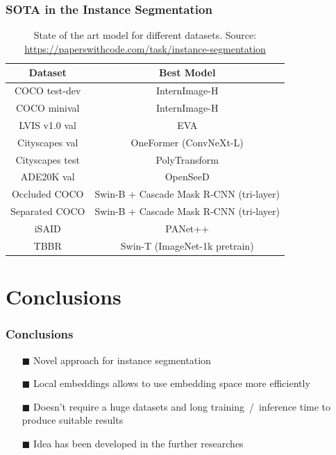 \documentclass{beamer}
\begin{document}
\begin{frame}
    \frametitle{SOTA in the Instance Segmentation}

    \begin{table}
        \begin{tabular}{|c|c|}
            \hline
            \textbf{Dataset} & \textbf{Best Model}                     \\
            \hline
            \hline
            COCO test-dev    & InternImage-H                           \\
            \hline
            COCO minival     & InternImage-H                           \\
            \hline
            LVIS v1.0 val    & EVA                                     \\
            \hline
            Cityscapes val   & OneFormer (ConvNeXt-L)                  \\
            \hline
            Cityscapes test  & PolyTransform                           \\
            \hline
            ADE20K val       & OpenSeeD                                \\
            \hline
            Occluded COCO    & Swin-B + Cascade Mask R-CNN (tri-layer) \\
            \hline
            Separated COCO   & Swin-B + Cascade Mask R-CNN (tri-layer) \\
            \hline
            iSAID            & PANet++                                 \\
            \hline
            TBBR             & Swin-T (ImageNet-1k pretrain)           \\
            \hline
        \end{tabular}
        \caption{State of the art model for different datasets. Source:
            \url{https://paperswithcode.com/task/instance-segmentation}}
    \end{table}

\end{frame}

\section*{Conclusions}
\begin{frame}
    \frametitle{Conclusions}

    \begin{itemize}
        \item[$\blacksquare$] Novel approach for instance segmentation
        \item[$\blacksquare$] Local embeddings allows to use embedding space more efficiently
        \item[$\blacksquare$] Doesn't require a huge datasets and long training~/~inference time
            to produce suitable results
        \item[$\blacksquare$] Idea has been developed in the further researches
    \end{itemize}

\end{frame}
\end{document}
